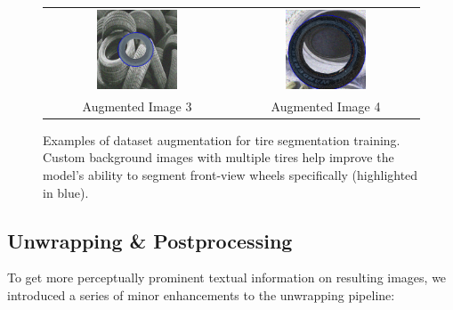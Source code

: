\documentclass{article}
\begin{document}
\begin{figure}[H]
\begin{tabular}{cc}
        \includegraphics[width=0.45\textwidth]{assets/seg_aug_dataset/aug2.png} &
        \includegraphics[width=0.45\textwidth]{assets/seg_aug_dataset/aug3.png}                            \\
        \small Augmented Image 3                                                & \small Augmented Image 4 \\
    \end{tabular}
    \caption{Examples of dataset augmentation for tire segmentation training. Custom background images with multiple tires help improve the model's ability to segment front-view wheels specifically (highlighted in blue).}
    \label{fig:seg_augmentation}
\end{figure}

\subsection{Unwrapping \& Postprocessing}
To get more perceptually prominent textual information on resulting images, we introduced a series of minor enhancements to the unwrapping pipeline:
\end{document}
